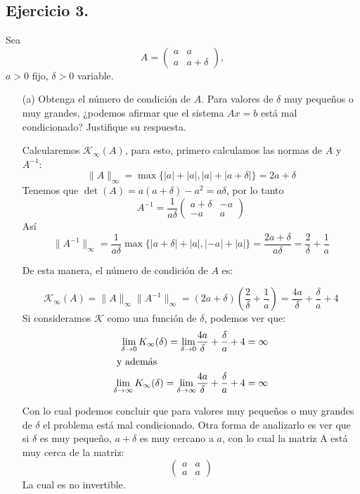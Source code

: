
\subsection*{Ejercicio 3.}
Sea
\[
A =
\begin{pmatrix}
a & a \\
a & a + \delta
\end{pmatrix},
\]
$a > 0$ fijo, $\delta > 0$ variable.

\begin{enumerate}
    \item[(a)] Obtenga el número de condición de $A$. Para valores de $\delta$ muy pequeños o muy grandes, ¿podemos afirmar que el sistema $Ax = b$ está mal condicionado? Justifique su respuesta.\\ 

    \begin{solution}
    Calcularemos $\mathcal{K}_\infty(A)$, para esto, primero calculamos las normas de $A$ y $A^{-1}$:
    \[
    \|A\|_\infty=\max{\{|a|+|a|,|a|+|a+\delta|\}}= 2a + \delta
    \]
    Tenemos que $\det{(A)}=a(a+\delta)-a^2=a\delta$, por lo tanto
    \[
    A^{-1}=\frac{1}{a\delta}\begin{pmatrix}
        a + \delta & -a \\ 
        -a & a
    \end{pmatrix}
    \]
    Así 
    \[
    \|A^{-1}\|_{\infty}=\frac{1}{a\delta}\max{\{|a+\delta|+|a|,|-a|+|a|\}}=\frac{2a+\delta}{a\delta}=\frac{2}{\delta}+\frac{1}{a}
    \]

    De esta manera, el número de condición de $A$ es:

    \[
    \mathcal{K}_{\infty}(A)=\|A\|_\infty \|A^{-1}\|_\infty=(2a+\delta)\left(\frac{2}{\delta}+\frac{1}{a}\right)=\frac{4a}{\delta} + \frac{\delta}{a} + 4
    \]
    Si consideramos $\mathcal{K}$ como una función de $\delta$, podemos ver que:
    \begin{align*}
    \lim_{\delta\rightarrow 0} K_{\infty}(\delta)= \lim_{\delta\rightarrow 0} & \frac{4a}{\delta} + \frac{\delta}{a}+4=\infty\\
    \intertext{ y además}
    \lim_{\delta\rightarrow \infty} K_{\infty}(\delta)= \lim_{\delta\rightarrow \infty} & \frac{4a}{\delta} + \frac{\delta}{a}+4=\infty
    \end{align*}

    Con lo cual podemos concluir que para valores muy pequeños o muy grandes de $\delta$ el problema está mal condicionado. Otra forma de analizarlo es ver que si $\delta$ es muy pequeño, $a + \delta$ es muy cercano a $a$, con lo cual la matriz A está muy cerca de la matriz:
    \[
    \begin{pmatrix}
    a & a \\ 
    a & a
    \end{pmatrix}
    \] 
    La cual es no invertible.


\end{solution}
\end{enumerate}
